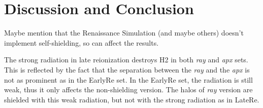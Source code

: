\documentclass[linenumbers, twocolumn]{aastex631}
\begin{document}


\section{Discussion and Conclusion}
Maybe mention that the Renaissance Simulation (and maybe others) doesn't implement self-shielding, so can affect the results.

The strong radiation in late reionization destroys H2 in both \textit{ray} and \textit{apx} sets. This is reflected by the fact that the separation between the \textit{ray} and the \textit{apx} is not as prominent as in the EarlyRe set. In the EarlyRe set, the radiation is still weak, thus it only affects the non-shielding version. The halos of \textit{ray} version are shielded with this weak radiation, but not with the strong radiation as in LateRe.  
\end{document}
